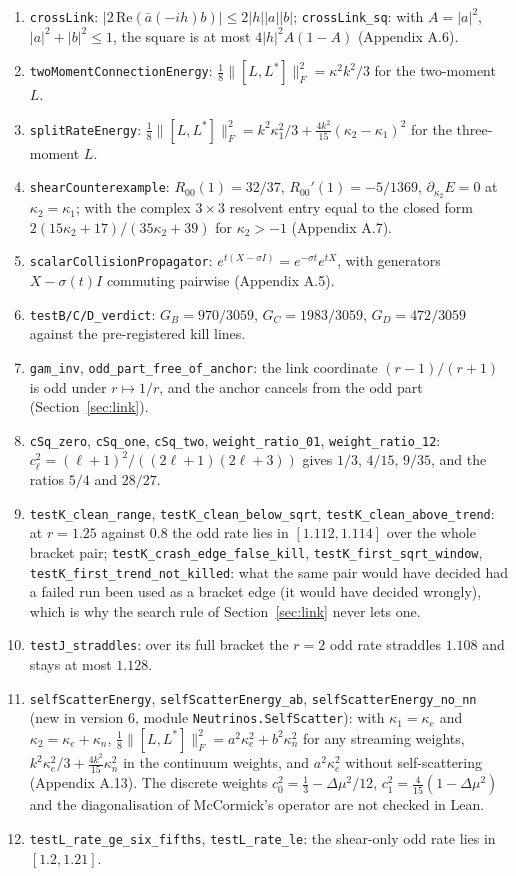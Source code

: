 \documentclass[11pt]{article}
\begin{document}
\begin{enumerate}
\item \texttt{crossLink}: $|2\,\mathrm{Re}(\bar a(-ih)b)|\le2|h||a||b|$; \texttt{crossLink\_sq}: with $A=|a|^2$, $|a|^2+|b|^2\le1$, the square is at most $4|h|^2A(1-A)$ (Appendix A.6).
\item \texttt{twoMomentConnectionEnergy}: $\tfrac18\lVert[L,L^\ast]\rVert_F^2=\kappa^2k^2/3$ for the two-moment $L$.
\item \texttt{splitRateEnergy}: $\tfrac18\lVert[L,L^\ast]\rVert_F^2=k^2\kappa_1^2/3+\tfrac{4k^2}{15}(\kappa_2-\kappa_1)^2$ for the three-moment $L$.
\item \texttt{shearCounterexample}: $R_{00}(1)=32/37$, $R_{00}'(1)=-5/1369$, $\partial_{\kappa_2}E=0$ at $\kappa_2=\kappa_1$; with the complex $3\times3$ resolvent entry equal to the closed form $2(15\kappa_2+17)/(35\kappa_2+39)$ for $\kappa_2>-1$ (Appendix A.7).
\item \texttt{scalarCollisionPropagator}: $e^{t(X-\sigma I)}=e^{-\sigma t}e^{tX}$, with generators $X-\sigma(t)I$ commuting pairwise (Appendix A.5).
\item \texttt{testB/C/D\_verdict}: $G_B=970/3059$, $G_C=1983/3059$, $G_D=472/3059$ against the pre-registered kill lines.
\item \texttt{gam\_inv}, \texttt{odd\_part\_free\_of\_anchor}: the link coordinate $(r-1)/(r+1)$ is odd under $r\mapsto1/r$, and the anchor cancels from the odd part (Section~\ref{sec:link}).
\item \texttt{cSq\_zero}, \texttt{cSq\_one}, \texttt{cSq\_two}, \texttt{weight\_ratio\_01}, \texttt{weight\_ratio\_12}: $c_\ell^2=(\ell+1)^2/((2\ell+1)(2\ell+3))$ gives $1/3$, $4/15$, $9/35$, and the ratios $5/4$ and $28/27$.
\item \texttt{testK\_clean\_range}, \texttt{testK\_clean\_below\_sqrt}, \texttt{testK\_clean\_above\_trend}: at $r=1.25$ against $0.8$ the odd rate lies in $[1.112,1.114]$ over the whole bracket pair; \texttt{testK\_crash\_edge\_false\_kill}, \texttt{testK\_first\_sqrt\_window}, \texttt{testK\_first\_trend\_not\_killed}: what the same pair would have decided had a failed run been used as a bracket edge (it would have decided wrongly), which is why the search rule of Section~\ref{sec:link} never lets one.
\item \texttt{testJ\_straddles}: over its full bracket the $r=2$ odd rate straddles $1.108$ and stays at most $1.128$.
\item \texttt{selfScatterEnergy}, \texttt{selfScatterEnergy\_ab}, \texttt{selfScatterEnergy\_no\_nn} (new in version 6, module \texttt{Neutrinos.SelfScatter}): with $\kappa_1=\kappa_e$ and $\kappa_2=\kappa_e+\kappa_n$, $\tfrac18\lVert[L,L^\ast]\rVert_F^2=a^2\kappa_e^2+b^2\kappa_n^2$ for any streaming weights, $k^2\kappa_e^2/3+\tfrac{4k^2}{15}\kappa_n^2$ in the continuum weights, and $a^2\kappa_e^2$ without self-scattering (Appendix A.13). The discrete weights $c_0^2=\tfrac13-\Delta\mu^2/12$, $c_1^2=\tfrac4{15}(1-\Delta\mu^2)$ and the diagonalisation of McCormick's operator are not checked in Lean.
\item \texttt{testL\_rate\_ge\_six\_fifths}, \texttt{testL\_rate\_le}: the shear-only odd rate lies in $[1.2,1.21]$.
\end{enumerate}
\end{document}

